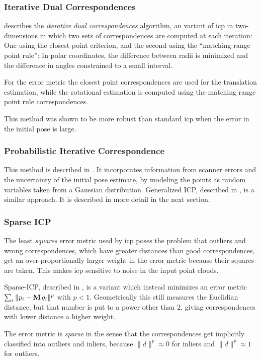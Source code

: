 \subsubsection{Iterative Dual Correspondences}
\cite{Lu1997} describes the \emph{iterative dual correspondences} algorithm, an variant of \gls{icp} in two-dimensions in which two sets of correspondences are computed at each iteration: One using the closest point criterion, and the second using the ``matching range point rule'': In polar coordinates, the difference between radii is minimized and the difference in angles constrained to a small interval.

For the error metric the closest point correspondences are used for the translation estimation, while the rotational estimation is computed using the matching range point rule correspondences.

This method was shown to be more robust than standard \gls{icp} when the error in the initial pose is large. \cite{Magn2013}


\subsubsection{Probabilistic Iterative Correspondence}
This method is described in \cite{Mont2005}. It incorporates information from scanner errors and the uncertainty of the initial pose estimate, by modeling the points as random variables taken from a Gaussian distribution. Generalized ICP, described in \cite{Sega2009}, is a similar approach. It is described in more detail in the next section.


\subsubsection{Sparse ICP}
The least \emph{squares} error metric used by \gls{icp} poses the problem that outliers and wrong correspondences, which have greater distances than good correspondences, get an over-proportionally larger weight in the error metric because their squares are taken. This makes \gls{icp} sensitive to noise in the input point clouds.

Sparse-ICP, described in \cite{Boua2013}, is a variant which instead minimizes an error metric $\sum_i \| p_i - \mathbf{M} \, q_i \|^p$ with $p < 1$. Geometrically this still measures the Euclidian distance, but that number is put to a power other than $2$, giving correspondences with lower distance a higher weight.

The error metric is \emph{sparse} in the sense that the correspondences get implicitly classified into outliers and inliers, because $\|d\|^p \approx 0$ for inliers and $\|d\|^p \approx 1$ for outliers.


